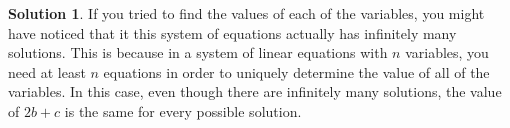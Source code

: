 \documentclass{article}
\theoremstyle{definition}
\newtheorem*{solution}{Solution}
\begin{document}
\begin{enumerate}
\begin{solution}
            If you tried to find the values of each of the variables, you might have noticed that it this system of equations actually has infinitely many solutions. This is because in a system of linear equations with $n$ variables, you need at least $n$ equations in order to uniquely determine the value of all of the variables. In this case, even though there are infinitely many solutions, the value of $2b + c$ is the same for every possible solution.
        \end{solution}
    \end{enumerate}
\end{document}
